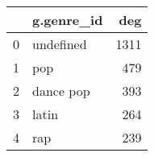 \begin{tabular}{llr}
\toprule
{} & g.genre\_id &   deg \\
\midrule
0 &  undefined &  1311 \\
1 &        pop &   479 \\
2 &  dance pop &   393 \\
3 &      latin &   264 \\
4 &        rap &   239 \\
\bottomrule
\end{tabular}
